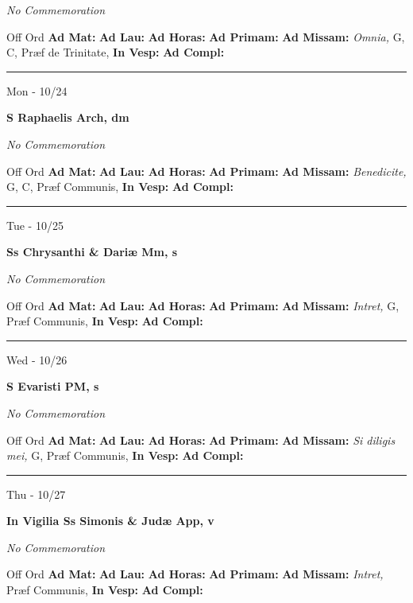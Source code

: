\documentclass[letterpaper, 10pt]{article}
\begin{document}
\textit{No Commemoration}\begin{justify}
Off Ord
\textbf{Ad Mat: }
\textbf{Ad Lau: }
\textbf{Ad Horas: }
\textbf{Ad Primam: }
\textbf{Ad Missam:} \textit{Omnia, } G, C, Præf de Trinitate, 
\textbf{In Vesp: }
\textbf{Ad Compl: }\end{justify}



\hrule
\begin{center}
Mon - 10/24
\end{center}\textbf{ \large S Raphaelis Arch, \textnormal{\normalsize dm}}

\textit{No Commemoration}\begin{justify}
Off Ord
\textbf{Ad Mat: }
\textbf{Ad Lau: }
\textbf{Ad Horas: }
\textbf{Ad Primam: }
\textbf{Ad Missam:} \textit{Benedicite, } G, C, Præf Communis, 
\textbf{In Vesp: }
\textbf{Ad Compl: }\end{justify}



\hrule
\begin{center}
Tue - 10/25
\end{center}\textbf{ \large Ss Chrysanthi \& Dariæ Mm, \textnormal{\normalsize s}}

\textit{No Commemoration}\begin{justify}
Off Ord
\textbf{Ad Mat: }
\textbf{Ad Lau: }
\textbf{Ad Horas: }
\textbf{Ad Primam: }
\textbf{Ad Missam:} \textit{Intret, } G, Præf Communis, 
\textbf{In Vesp: }
\textbf{Ad Compl: }\end{justify}



\hrule
\begin{center}
Wed - 10/26
\end{center}\textbf{ \large S Evaristi PM, \textnormal{\normalsize s}}

\textit{No Commemoration}\begin{justify}
Off Ord
\textbf{Ad Mat: }
\textbf{Ad Lau: }
\textbf{Ad Horas: }
\textbf{Ad Primam: }
\textbf{Ad Missam:} \textit{Si diligis mei, } G, Præf Communis, 
\textbf{In Vesp: }
\textbf{Ad Compl: }\end{justify}



\hrule
\begin{center}
Thu - 10/27
\end{center}\textbf{ \large In Vigilia Ss Simonis \& Judæ App, \textnormal{\normalsize v}}

\textit{No Commemoration}\begin{justify}
Off Ord
\textbf{Ad Mat: }
\textbf{Ad Lau: }
\textbf{Ad Horas: }
\textbf{Ad Primam: }
\textbf{Ad Missam:} \textit{Intret, } Præf Communis, 
\textbf{In Vesp: }
\textbf{Ad Compl: }\end{justify}
\end{document}
